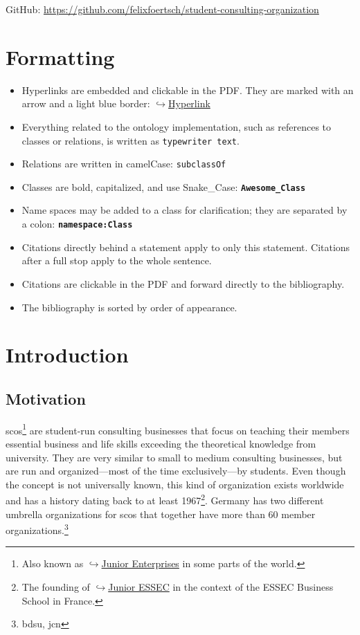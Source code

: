 \documentclass[a4paper, DIV=13, BCOR=0cm]{scrbook}
\newcommand{\class}[1]{\texttt{\textbf{#1}}}
\newcommand{\link}[2]{\href{#1}{$\hookrightarrow$#2}}
\begin{document}
GitHub: \url{https://github.com/felixfoertsch/student-consulting-organization}


\chapter*{Formatting}
\begin{itemize}
	\item Hyperlinks are embedded and clickable in the PDF. They are marked with an arrow and a light blue border: \link{https://hyperlink.com}{Hyperlink}
	\item Everything related to the ontology implementation, such as references to classes or relations, is written as \texttt{typewriter text}.
	\item Relations are written in camelCase: \texttt{subclassOf}
	\item Classes are bold, capitalized, and use Snake\_Case: \texttt{\textbf{Awesome\_Class}}
	\item Name spaces may be added to a class for clarification; they are separated by a colon: \class{namespace:Class}
	\item Citations directly behind a statement apply to only this statement. Citations after a full stop apply to the whole sentence.
	\item Citations are clickable in the PDF and forward directly to the bibliography.
	\item The bibliography is sorted by order of appearance.
\end{itemize}


\tableofcontents
\newpage

\mainmatter
\chapter{Introduction}
\section{Motivation}
\glspl{sco}\footnote{Also known as 
\link{https://en.wikipedia.org/wiki/Junior_enterprise}{Junior Enterprises} in some parts of the world.} are student-run consulting businesses that focus on teaching their members essential business and life skills exceeding the theoretical knowledge from university. They are very similar to small to medium consulting businesses, but are run and organized---most of the time exclusively---by students. Even though the concept is not universally known, this kind of organization exists worldwide and has a history dating back to at least 1967\footnote{The founding of \link{https://www.en.junioressec.com/}{Junior ESSEC} in the context of the ESSEC Business School in France.}. Germany has two different umbrella organizations for \glspl{sco} that together have more than 60 member organizations.\footnote{\gls{bdsu}, \gls{jcn}}
\end{document}

